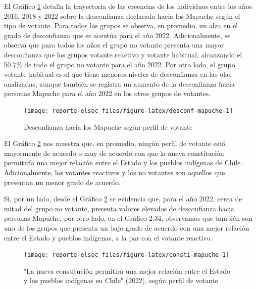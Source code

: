 \documentclass[
  12pt,
]{book}
\begin{document}
El Gráfico \ref{fig:desconf-mapuche} detalla la trayectoria de las creencias de los individuos entre los años 2016, 2018 y 2022 sobre la desconfianza declarada hacia los Mapuche según el tipo de votante. Para todos los grupos se observa, en promedio, un alza en el grado de desconfianza que se acentúa para el año 2022. Adicionalmente, se observa que para todos los años el grupo no votante presenta una mayor desconfianza que los grupos votante reactivo y votante habitual, alcanzando el 50.7\% de todo el grupo no votante para el año 2022. Por otro lado, el grupo votante habitual es el que tiene menores niveles de desconfianza en las olas analizadas, aunque también se registra un aumento de la desconfianza hacia personas Mapuche para el año 2022 en los otros grupos de votantes.

\begin{figure}

{\centering \texttt{[image: reporte-elsoc\_files/figure-latex/desconf-mapuche-1]} 

}

\caption{Desconfianza hacia los Mapuche según perfil de votante}\label{fig:desconf-mapuche}
\end{figure}

El Gráfico \ref{fig:consti-mapuche} nos muestra que, en promedio, ningún perfil de votante está mayormente de acuerdo o muy de acuerdo con que la nueva constitución permitiría una mejor relación entre el Estado y los pueblos indígenas de Chile. Adicionalmente, los votantes reactivos y los no votantes son aquellos que presentan un menor grado de acuerdo.

Si, por un lado, desde el Gráfico \ref{fig:consti-mapuche} se evidencia que, para el año 2022, cerca de mitad del grupo no votante, presenta valores elevados de desconfianza hacia personas Mapuche, por otro lado, en el Gráfico 2.34, observamos que también son uno de los grupos que presenta un bajo grado de acuerdo con una mejor relación entre el Estado y pueblos indígenas, a la par con el votante reactivo.

\begin{figure}

{\centering \texttt{[image: reporte-elsoc\_files/figure-latex/consti-mapuche-1]} 

}

\caption{"La nueva constitución permitirá una mejor relación entre el Estado y los pueblos indígenas en Chile" (2022), según perfil de votante}\label{fig:consti-mapuche}
\end{figure}
\end{document}
